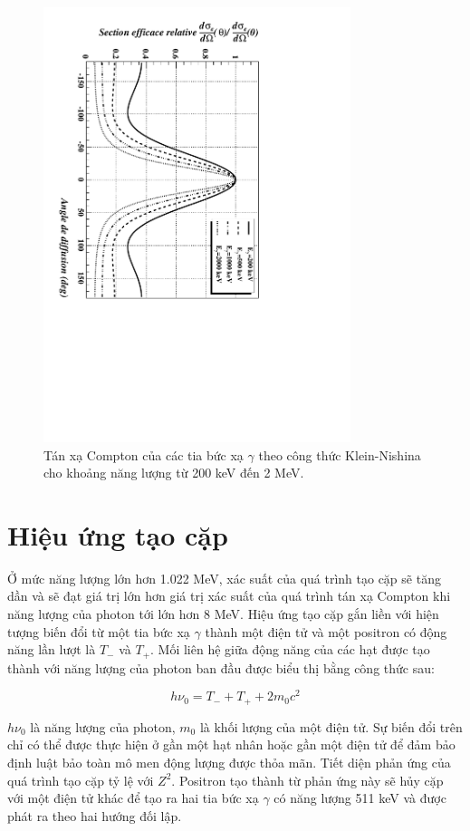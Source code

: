 \begin{figure}[!h]%
\centering
\includegraphics[width=0.8\textwidth]{figure/fig_cosolythuyet/klein.pdf}
\caption{Tán xạ Compton của các tia bức xạ $\gamma$ theo công thức Klein-Nishina cho khoảng năng lượng từ 200 keV đến 2 MeV.}
\label{fig:klein}
\end{figure}%

\section{Hiệu ứng tạo cặp}

Ở mức năng lượng lớn hơn 1.022 MeV, xác suất của quá trình tạo cặp sẽ tăng dần và sẽ đạt giá trị lớn hơn giá trị xác suất của quá trình tán xạ Compton khi năng lượng của photon tới lớn hơn 8 MeV. Hiệu ứng tạo cặp gắn liền với hiện tượng biến đổi từ một tia bức xạ $\gamma$ thành một 		điện tử và một positron có động năng lần lượt là $T_{-}$ và $T_{+}$. Mối liên hệ giữa động năng của các hạt được tạo thành với năng lượng của photon ban đầu được biểu thị bằng công thức sau:

\begin{equation}
	h\nu_{0} = T_{-} + T_{+} + 2m_{0}c^{2}
\end{equation}

$h\nu_{0}$ là năng lượng của photon, $m_{0}$ là khối lượng của một điện tử. Sự biến đổi trên chỉ có thể được thực hiện ở gần một hạt nhân hoặc gần một điện tử để đảm bảo 	  định luật bảo toàn mô men động lượng được thỏa mãn. Tiết diện phản ứng của quá trình tạo cặp tỷ lệ với $Z^{2}$. Positron tạo thành từ phản ứng này sẽ hủy cặp với một điện tử khác để tạo ra hai tia bức xạ $\gamma$ có năng lượng 511 keV và được phát ra theo hai hướng đối lập.